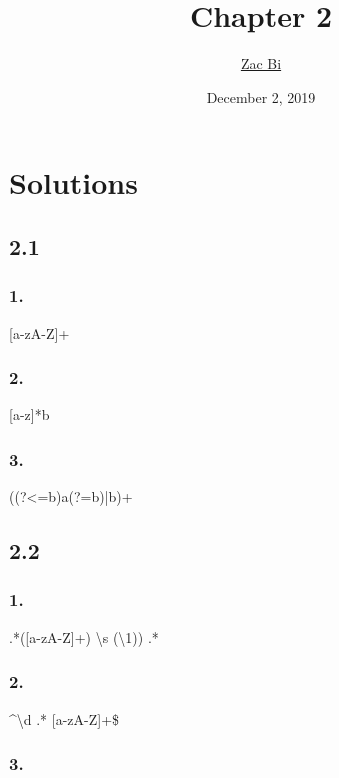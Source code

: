 \documentclass{article}
\begin{document}
\begin{titlepage}
    \title{Chapter 2}
    \author{\href{https://github.com/ZacBi}{Zac Bi}}
    \date{December 2, 2019}
    \maketitle
    \pagestyle{empty}
\end{titlepage}


\section*{Solutions}

\subsection*{2.1}

\subsubsection*{1.}

[a-zA-Z]+

\subsubsection*{2.}

[a-z]*b

\subsubsection*{3.}

((?<=b)a(?=b)|b)+

\subsection*{2.2}

\subsubsection*{1.}

.*([a-zA-Z]+) \textbackslash s (\textbackslash 1)) .*

\subsubsection*{2.}

\^{}\textbackslash d .* [a-zA-Z]+\$

\subsubsection*{3.}
\end{document}
